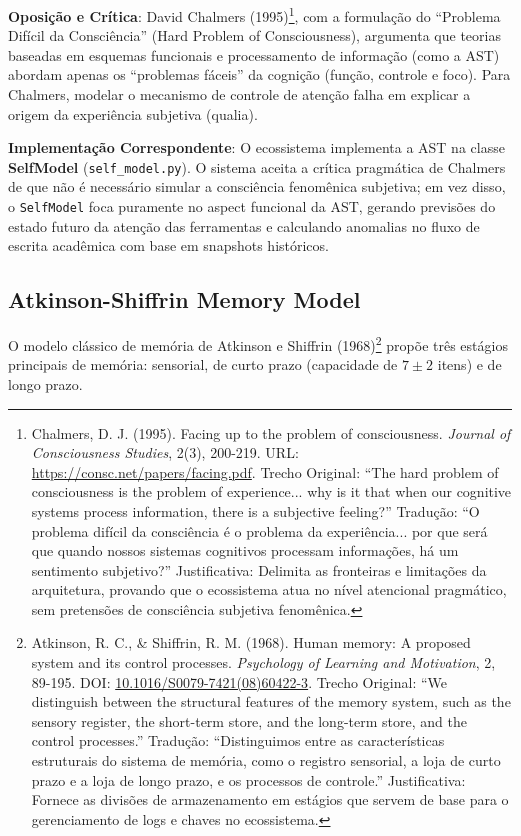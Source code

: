 \documentclass[12pt,a4paper,oneside]{abntex2}
\begin{document}
\textbf{Oposição e Crítica}: David Chalmers (1995)\footnote{Chalmers, D. J. (1995). Facing up to the problem of consciousness. \textit{Journal of Consciousness Studies}, 2(3), 200-219. URL: \href{https://consc.net/papers/facing.pdf}{https://consc.net/papers/facing.pdf}. Trecho Original: ``The hard problem of consciousness is the problem of experience... why is it that when our cognitive systems process information, there is a subjective feeling?'' Tradução: ``O problema difícil da consciência é o problema da experiência... por que será que quando nossos sistemas cognitivos processam informações, há um sentimento subjetivo?'' Justificativa: Delimita as fronteiras e limitações da arquitetura, provando que o ecossistema atua no nível atencional pragmático, sem pretensões de consciência subjetiva fenomênica.}, com a formulação do ``Problema Difícil da Consciência'' (Hard Problem of Consciousness), argumenta que teorias baseadas em esquemas funcionais e processamento de informação (como a AST) abordam apenas os ``problemas fáceis'' da cognição (função, controle e foco). Para Chalmers, modelar o mecanismo de controle de atenção falha em explicar a origem da experiência subjetiva (qualia).

\textbf{Implementação Correspondente}: O ecossistema implementa a AST na classe \textbf{SelfModel} (\texttt{self\_model.py}). O sistema aceita a crítica pragmática de Chalmers de que não é necessário simular a consciência fenomênica subjetiva; em vez disso, o \texttt{SelfModel} foca puramente no aspect funcional da AST, gerando previsões do estado futuro da atenção das ferramentas e calculando anomalias no fluxo de escrita acadêmica com base em snapshots históricos.

\subsection{Atkinson-Shiffrin Memory Model}

O modelo clássico de memória de Atkinson e Shiffrin (1968)\footnote{Atkinson, R. C., \& Shiffrin, R. M. (1968). Human memory: A proposed system and its control processes. \textit{Psychology of Learning and Motivation}, 2, 89-195. DOI: \href{https://doi.org/10.1016/S0079-7421(08)60422-3}{10.1016/S0079-7421(08)60422-3}. Trecho Original: ``We distinguish between the structural features of the memory system, such as the sensory register, the short-term store, and the long-term store, and the control processes.'' Tradução: ``Distinguimos entre as características estruturais do sistema de memória, como o registro sensorial, a loja de curto prazo e a loja de longo prazo, e os processos de controle.'' Justificativa: Fornece as divisões de armazenamento em estágios que servem de base para o gerenciamento de logs e chaves no ecossistema.} propõe três estágios principais de memória: sensorial, de curto prazo (capacidade de $7 \pm 2$ itens) e de longo prazo.
\end{document}
